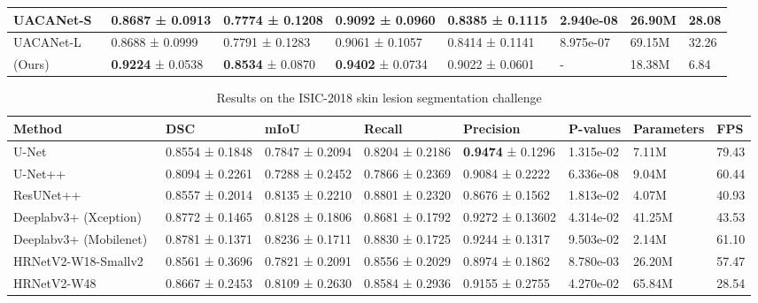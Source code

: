 \documentclass[journal,twoside,web]{IEEEtran}
\newcommand{\sysname}{\text{MSRF-Net}\xspace}
\begin{document}
\begin{table*}[!t]
\begin{tabular}{@{}l|l|l|l|l|l|l|l@{}}
UACANet-S~\cite{kim2021uacanet} &0.8687 ± 0.0913 & 0.7774 ± 0.1208 & 0.9092 ± 0.0960& 0.8385 ± 0.1115 & 2.940e-08 & 26.90M & 28.08 \\ \hline
UACANet-L~\cite{kim2021uacanet}&0.8688 ± 0.0999 &0.7791 ± 0.1283 &0.9061 ± 0.1057 & 0.8414 ± 0.1141 & 8.975e-07 & 69.15M & 32.26 \\ \hline
\sysname (Ours)  &\textbf{0.9224} ± 0.0538 &\textbf{0.8534} ± 0.0870  & \textbf{0.9402} ± 0.0734  & 0.9022 ± 0.0601 & - & 18.38M & 6.84 \\ \hline 
\bottomrule
\end{tabular}
\vspace{-5mm}
\end{table*}



\begin{table*}[!t]
\centering
\scriptsize
\caption{Results on the ISIC-2018 skin lesion segmentation challenge}
\label{tab:result4}
\begin{tabular}{@{}l|l|l|l|l|l|l|l@{}}
\toprule
\textbf{Method} & \textbf{DSC}  & \textbf{mIoU}& \textbf{Recall} & \textbf{Precision}& \textbf{P-values} & \textbf{Parameters} & \textbf{FPS}\\  \hline
\hline
\hline
U-Net~\cite{ronneberger2015u} & 0.8554 ± 0.1848  & 0.7847 ± 0.2094 & 0.8204 ± 0.2186 & \textbf{0.9474} ± 0.1296 & 1.315e-02 & 7.11M & 79.43 \\ \hline
U-Net++~\cite{zhou2019unet++}  & 0.8094 ± 0.2261 & 0.7288 ± 0.2452 & 0.7866 ±  0.2369 & 0.9084 ± 0.2222 & 6.336e-08 & 9.04M & 60.44 \\ \hline
ResUNet++~\cite{jha2019resunet++} & 0.8557 ± 0.2014 & 0.8135 ± 0.2210 & 0.8801 ± 0.2320 & 0.8676 ± 0.1562 & 1.813e-02 & 4.07M & 40.93 \\ \hline
Deeplabv3+ (Xception)~\cite{chen2018encoder} & 0.8772 ± 0.1465 & 0.8128 ± 0.1806 & 0.8681 ± 0.1792 & 0.9272 ± 0.13602 & 4.314e-02 & 41.25M & 43.53 \\\hline
Deeplabv3+ (Mobilenet)~\cite{chen2018encoder} & 0.8781 ± 0.1371 & 0.8236 ± 0.1711 & 0.8830 ± 0.1725 & 0.9244 ± 0.1317 & 9.503e-02 & 2.14M & 61.10 \\ \hline
HRNetV2-W18-Smallv2~\cite{Wang_2020} & 0.8561 ± 0.3696 & 0.7821 ± 0.2091 & 0.8556 ± 0.2029 & 0.8974 ± 0.1862 & 8.780e-03 & 26.20M & 57.47 \\ \hline 
HRNetV2-W48~\cite{Wang_2020} & 0.8667 ± 0.2453 & 0.8109 ± 0.2630 & 0.8584 ± 0.2936 & 0.9155 ± 0.2755 & 4.270e-02 & 65.84M & 28.54 \\ \hline


\end{tabular}
\end{table*}
\end{document}

